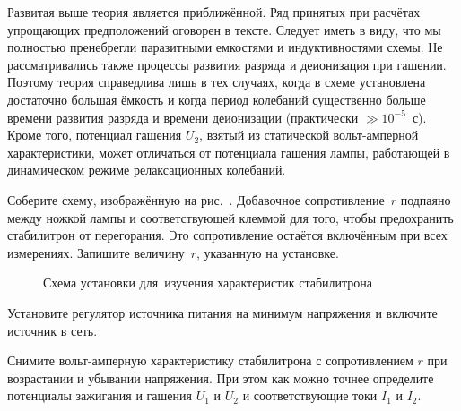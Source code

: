 Развитая выше теория является приближённой. Ряд принятых при расчётах упрощающих
предположений оговорен в тексте.
Следует иметь в виду, что мы полностью пренебрегли паразитными емкостями и
индуктивностями схемы. Не рассматривались
также процессы развития разряда и деионизация при гашении. Поэтому теория
справедлива лишь в тех случаях, когда в схеме
установлена достаточно большая ёмкость и когда период колебаний существенно
больше времени развития разряда и времени
деионизации (практически $\gg10^{-5}$~с). 
Кроме того, потенциал гашения $U_2$, взятый из статической вольт-амперной
характеристики, может отличаться от потенциала гашения лампы, работающей в
динамическом режиме релаксационных колебаний.

\begin{lab:task}



		\item Соберите схему, изображённую на рис.~. Добавочное сопротивление~$r$ подпаяно между ножкой лампы и
соответствующей клеммой для того, чтобы предохранить стабилитрон от перегорания. 
Это сопротивление остаётся включённым при всех
измерениях. Запишите величину~$r$, указанную на установке.

\begin{figure}[h!]
    \centering
    \caption{Схема установки для~изучения характеристик стабилитрона}
\end{figure}

		\item Установите регулятор источника питания на минимум напряжения и
включите источник в сеть.

		\item Снимите вольт-амперную характеристику стабилитрона с
сопротивлением $r$ при возрастании и убывании напряжения. При
этом как можно точнее определите потенциалы зажигания и гашения $U_1$ и $U_2$ и
соответствующие токи $I_1$ и $I_2$.


\end{lab:task}
